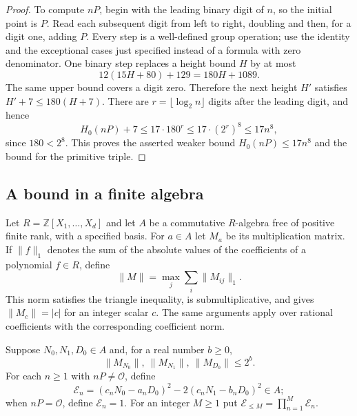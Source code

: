 \documentclass[11pt]{article}
\theoremstyle{definition}
\begin{document}
\begin{proof}
To compute $nP$, begin with the leading binary digit of $n$, so the
initial point is $P$.  Read each subsequent digit from left to right,
doubling and then, for a digit one, adding $P$.  Every step is a
well-defined group operation; use the identity and the exceptional
cases just specified instead of a formula with zero denominator.
One binary step replaces a height bound $H$ by at most
\[
                     12(15H+80)+129=180H+1089.
\]
The same upper bound covers a digit zero.  Therefore the next height
$H'$ satisfies $H'+7\le180(H+7)$.  There are
$r=\lfloor\log_2 n\rfloor$ digits after the leading digit, and hence
\[
 H_0(nP)+7\le17\cdot180^r
       \le17\cdot(2^r)^8\le17n^8,
\]
since $180<2^8$.  This proves the asserted weaker bound
$H_0(nP)\le17n^8$ and the bound for the primitive triple.
\end{proof}

\subsection{A bound in a finite algebra}

Let $R=\mathbb Z[X_1,\ldots,X_d]$ and let $A$ be a commutative
$R$-algebra free of positive finite rank, with a specified basis.  For
$a\in A$ let $M_a$ be its multiplication matrix.  If
$\|f\|_1$ denotes the sum of the absolute values of the coefficients
of a polynomial $f\in R$, define
\[
              \|M\|=\max_j\sum_i\|M_{ij}\|_1.
\]
This norm satisfies the triangle inequality, is submultiplicative,
and gives $\|M_c\|=|c|$ for an integer scalar $c$.
The same arguments apply over rational coefficients with the
corresponding coefficient norm.

Suppose $N_0,N_1,D_0\in A$ and, for a real number $b\ge0$,
\[
        \|M_{N_0}\|,\ \|M_{N_1}\|,\ \|M_{D_0}\|\le2^b.
\]
For each $n\ge1$ with $nP\ne\mathcal O$, define
\[
 \mathcal E_n=(c_nN_0-a_nD_0)^2
                       -2(c_nN_1-b_nD_0)^2\in A;
\]
when $nP=\mathcal O$, define $\mathcal E_n=1$.  For an integer
$M\ge1$ put $\mathcal E_{\le M}=\prod_{n=1}^M\mathcal E_n$.
\end{document}
